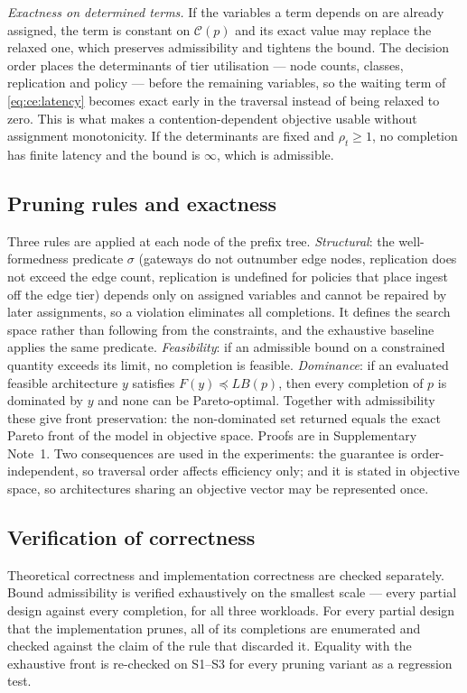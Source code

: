\documentclass[pdflatex,sn-nature,lineno]{sn-jnl}
\newcommand{\C}{\mathcal{C}}
\newcommand{\LB}{\mathit{LB}}
\begin{document}
\emph{Exactness on determined terms.} If the variables a term depends on are already
assigned, the term is constant on $\C(p)$ and its exact value may replace the relaxed
one, which preserves admissibility and tightens the bound. The decision order places the
determinants of tier utilisation --- node counts, classes, replication and policy ---
before the remaining variables, so the waiting term of \eqref{eq:ce:latency} becomes
exact early in the traversal instead of being relaxed to zero. This is what makes a
contention-dependent objective usable without assignment monotonicity. If the
determinants are fixed and $\rho_t\ge1$, no completion has finite latency and the bound
is $\infty$, which is admissible.

\subsection{Pruning rules and exactness}
Three rules are applied at each node of the prefix tree. \emph{Structural}: the
well-formedness predicate $\sigma$ (gateways do not outnumber edge nodes, replication
does not exceed the edge count, replication is undefined for policies that place ingest
off the edge tier) depends only on assigned variables and cannot be repaired by later
assignments, so a violation eliminates all completions. It defines the search space
rather than following from the constraints, and the exhaustive baseline applies the same
predicate. \emph{Feasibility}: if an admissible bound on a constrained quantity exceeds
its limit, no completion is feasible. \emph{Dominance}: if an evaluated feasible
architecture $y$ satisfies $F(y)\preceq \LB(p)$, then every completion of $p$ is
dominated by $y$ and none can be Pareto-optimal. Together with admissibility these give
front preservation: the non-dominated set returned equals the exact Pareto front of the
model in objective space. Proofs are in Supplementary Note~1. Two consequences are used
in the experiments: the guarantee is order-independent, so traversal order affects
efficiency only; and it is stated in objective space, so architectures sharing an
objective vector may be represented once.

\subsection{Verification of correctness}
Theoretical correctness and implementation correctness are checked separately. Bound
admissibility is verified exhaustively on the smallest scale --- every partial design
against every completion, for all three workloads. For every partial design that the
implementation prunes, all of its completions are enumerated and checked against the
claim of the rule that discarded it. Equality with the exhaustive front is re-checked on
S1--S3 for every pruning variant as a regression test.
\end{document}
